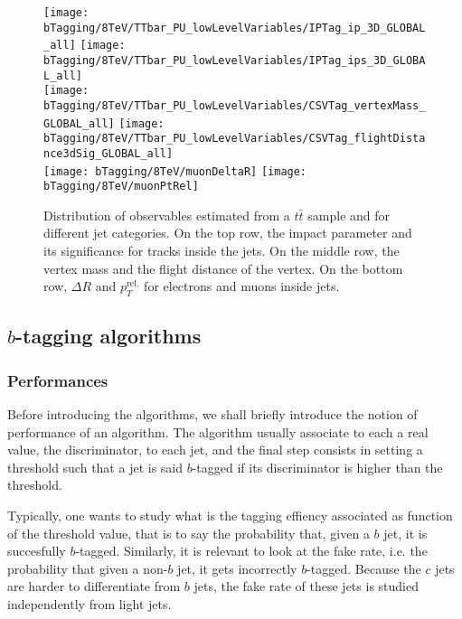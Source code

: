     \begin{figure}[th!]
        \centering
        \begin{minipage}{\textwidth}
        \texttt{[image: bTagging/8TeV/TTbar\_PU\_lowLevelVariables/IPTag\_ip\_3D\_GLOBAL\_all]}
        \texttt{[image: bTagging/8TeV/TTbar\_PU\_lowLevelVariables/IPTag\_ips\_3D\_GLOBAL\_all]}\\
        \texttt{[image: bTagging/8TeV/TTbar\_PU\_lowLevelVariables/CSVTag\_vertexMass\_GLOBAL\_all]}
        \texttt{[image: bTagging/8TeV/TTbar\_PU\_lowLevelVariables/CSVTag\_flightDistance3dSig\_GLOBAL\_all]}\\
        \hspace*{0.4cm}
        \texttt{[image: bTagging/8TeV/muonDeltaR]}
        \texttt{[image: bTagging/8TeV/muonPtRel]}
        \end{minipage}
        \caption{Distribution of observables estimated from a $t\bar{t}$ sample and for
        different jet categories. On the top row, the impact parameter and its significance
        for tracks inside the jets. On the middle row, the vertex mass and the flight
        distance of the vertex. On the bottom row, $\Delta R$ and $p_T^\text{rel.}$ for
        electrons and muons inside jets.}
        \label{fig:bTagging/lowLevelVariables}
    \end{figure}

    \subsection{$b$-tagging algorithms}

        \subsubsection{Performances}

    Before introducing the algorithms, we shall briefly introduce the notion of performance
    of an algorithm. The algorithm usually associate to each a real value, the discriminator,
    to each jet, and the final step consists in setting a threshold such that a jet
    is said $b$-tagged if its discriminator is higher than the threshold.

    Typically, one wants to study what is the tagging effiency associated as function of
    the threshold value, that is to say the probability that, given a $b$ jet, it is
    succesfully $b$-tagged. Similarly, it is relevant to look at the fake rate, i.e. the
    probability that given a non-$b$ jet, it gets incorrectly $b$-tagged. Because the $c$
    jets are harder to differentiate from $b$ jets, the fake rate of these jets is studied
    independently from light jets.

